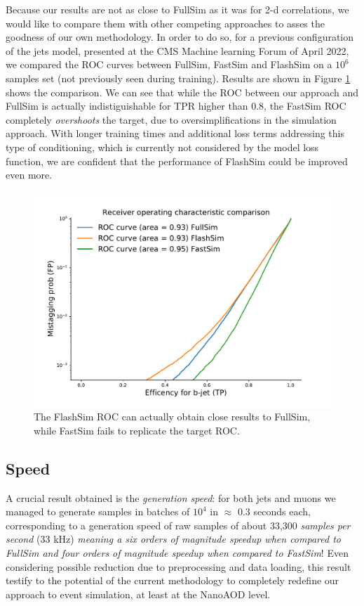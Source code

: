 Because our results are not as close to FullSim as it was for 2-d correlations, we would like to compare them with other competing approaches to asses the goodness of our own methodology. In order to do so, for a previous configuration of the jets model, presented at the CMS Machine learning Forum of April 2022, we compared the ROC curves between FullSim, FastSim and FlashSim on a $10^{6}$ samples set (not previously seen during training). Results are shown in Figure \ref{fig:allrocs} shows the comparison. We can see that while the ROC between our approach and FullSim is actually indistiguishable for TPR higher than 0.8, the FastSim ROC completely \emph{overshoots} the target, due to oversimplifications in the simulation approach. With longer training times and additional loss terms addressing this type of conditioning, which is currently not considered by the model loss function, we are confident that the performance of FlashSim could be improved even more.

\begin{figure}
    \centering
    \includegraphics[width=\linewidth]{gfx/ch5/allrocs.pdf}
    \caption[ROC Comparison]{The FlashSim ROC can actually obtain close results to FullSim, while FastSim fails to replicate the target ROC.}
    \label{fig:allrocs}
\end{figure}


\subsection{Speed}

A crucial result obtained is the \emph{generation speed}: for both jets and muons we managed to generate samples in batches of $10^{4}$ in $\approx$ 0.3 seconds each, corresponding to a generation speed of raw samples of about 33,300 \emph{samples per second} (33 kHz) \emph{meaning a six orders of magnitude speedup when compared to FullSim and four orders of magnitude speedup when compared to FastSim}! Even considering possible reduction due to preprocessing and data loading, this result testify to the potential of the current methodology to completely redefine our approach to event simulation, at least at the NanoAOD level.

